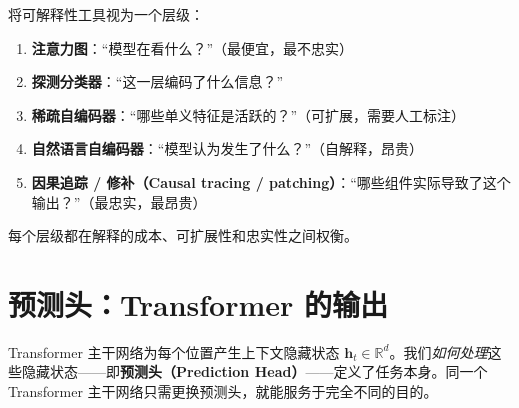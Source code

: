 \begin{intuitionbox}[可解释性层级栈]
将可解释性工具视为一个层级：

\begin{enumerate}
  \item \textbf{注意力图}：``模型在看什么？''（最便宜，最不忠实）
  \item \textbf{探测分类器}：``这一层编码了什么信息？''
  \item \textbf{稀疏自编码器}：``哪些单义特征是活跃的？''（可扩展，需要人工标注）
  \item \textbf{自然语言自编码器}：``模型认为发生了什么？''（自解释，昂贵）
  \item \textbf{因果追踪 / 修补（Causal tracing / patching）}：``哪些组件实际导致了这个输出？''（最忠实，最昂贵）
\end{enumerate}

每个层级都在解释的成本、可扩展性和忠实性之间权衡。
\end{intuitionbox}

\section{预测头：Transformer 的输出}
\label{prediction-heads-what-transformers-output}

Transformer 主干网络为每个位置产生上下文隐藏状态 $\mathbf{h}_t \in \mathbb{R}^d$。我们\emph{如何处理}这些隐藏状态——即\textbf{预测头（Prediction Head）}——定义了任务本身。同一个 Transformer 主干网络只需更换预测头，就能服务于完全不同的目的。

